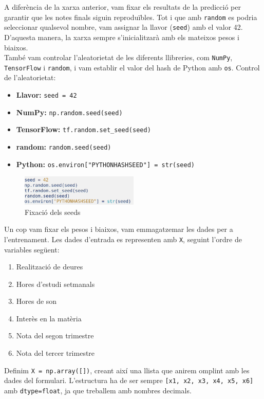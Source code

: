 A diferència de la xarxa anterior, vam fixar els resultats de la predicció per garantir que les notes finals siguin reproduïbles. Tot i que amb \texttt{random} es podria seleccionar qualsevol nombre, vam assignar la llavor (\texttt{seed}) amb el valor 42. D’aquesta manera, la xarxa sempre s’inicialitzarà amb els mateixos pesos i biaixos.\\[0.2cm]
També vam controlar l’aleatorietat de les diferents llibreries, com \texttt{NumPy}, \texttt{TensorFlow} i \texttt{random}, i vam establir el valor del hash de Python amb \texttt{os}.
Control de l’aleatorietat:
\begin{itemize}
\item \textbf{Llavor:} \texttt{seed = 42}
\item \textbf{NumPy:} \texttt{np.random.seed(seed)}
\item \textbf{TensorFlow:} \texttt{tf.random.set\_seed(seed)}
\item \textbf{random:} \texttt{random.seed(seed)}
\item \textbf{Python:} \texttt{os.environ["PYTHONHASHSEED"] = str(seed)}
\end{itemize}

\begin{figure}[h!]
\centering
\includegraphics[width=0.5\textwidth]{./figures/22.png}
\caption{Fixació dels seeds}
\end{figure}

Un cop vam fixar els pesos i biaixos, vam emmagatzemar les dades per a l’entrenament. Les dades d’entrada es representen amb \texttt{X}, seguint l’ordre de variables següent:

\begin{enumerate}
\item Realització de deures
\item Hores d’estudi setmanals
\item Hores de son
\item Interès en la matèria
\item Nota del segon trimestre
\item Nota del tercer trimestre
\end{enumerate}

Definim \texttt{X = np.array([])}, creant així una llista que anirem omplint amb les dades del formulari. L’estructura ha de ser sempre \texttt{[x1, x2, x3, x4, x5, x6]} amb \texttt{dtype=float}, ja que treballem amb nombres decimals.

